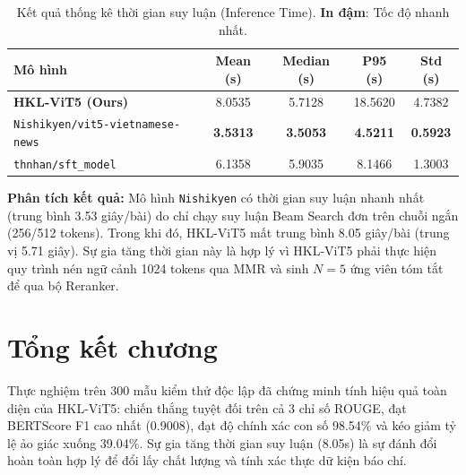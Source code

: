 \begin{table}[H]
  \centering
  \caption{Kết quả thống kê thời gian suy luận (Inference Time). \textbf{In đậm}: Tốc độ nhanh nhất.}
  \label{tab:results_performance}
  \begin{tabularx}{\linewidth}{X CCCC}
    \toprule
    Mô hình & Mean (s) & Median (s) & P95 (s) & Std (s) \\
    \midrule
    \textbf{HKL-ViT5 (Ours)}               & 8.0535 & 5.7128 & 18.5620 & 4.7382 \\
    \texttt{Nishikyen/\allowbreak vit5-vietnamese-news} & \textbf{3.5313} & \textbf{3.5053} & \textbf{4.5211} & \textbf{0.5923} \\
    \texttt{thnhan/sft\_model}             & 6.1358 & 5.9035 & 8.1466 & 1.3003 \\
    \bottomrule
  \end{tabularx}
\end{table}

\noindent \textbf{Phân tích kết quả:}
Mô hình \texttt{Nishikyen} có thời gian suy luận nhanh nhất (trung bình 3.53 giây/bài) do chỉ chạy suy luận Beam Search đơn trên chuỗi ngắn (256/512 tokens). Trong khi đó, HKL-ViT5 mất trung bình 8.05 giây/bài (trung vị 5.71 giây). Sự gia tăng thời gian này là hợp lý vì HKL-ViT5 phải thực hiện quy trình nén ngữ cảnh 1024 tokens qua MMR và sinh $N=5$ ứng viên tóm tắt để qua bộ Reranker.

\section{Tổng kết chương}

Thực nghiệm trên 300 mẫu kiểm thử độc lập đã chứng minh tính hiệu quả toàn diện của HKL-ViT5: chiến thắng tuyệt đối trên cả 3 chỉ số ROUGE, đạt BERTScore F1 cao nhất (0.9008), đạt độ chính xác con số 98.54\% và kéo giảm tỷ lệ ảo giác xuống 39.04\%. Sự gia tăng thời gian suy luận (8.05s) là sự đánh đổi hoàn toàn hợp lý để đổi lấy chất lượng và tính xác thực dữ kiện báo chí.
